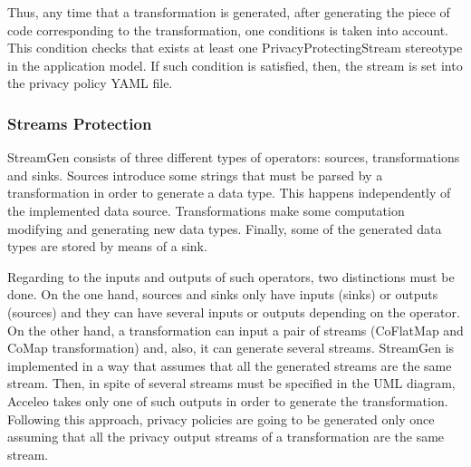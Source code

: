 

Thus, any time that a transformation is generated, after generating the piece of code corresponding to the transformation, one conditions is taken into account. This condition checks that exists at least one PrivacyProtectingStream stereotype in the application model. If such condition is satisfied, then, the stream is set into the privacy policy YAML file.

\subsubsection{Streams Protection}

StreamGen consists of three different types of operators: sources, transformations and sinks. Sources introduce some strings that must be parsed by a transformation in order to generate a data type. This happens independently of the implemented data source. Transformations make some computation modifying and generating new data types. Finally, some of the generated data types are stored by means of a sink.

Regarding to the inputs and outputs of such operators, two distinctions must be done. On the one hand, sources and sinks only have inputs (sinks) or outputs (sources) and they can have several inputs or outputs depending on the operator. On the other hand, a transformation can input a pair of streams (CoFlatMap and CoMap transformation) and, also, it can generate several streams. StreamGen is implemented in a way that assumes that all the generated streams are the same stream. Then, in spite of several streams must be specified in the UML diagram, Acceleo takes only one of such outputs in order to generate the transformation. Following this approach, privacy policies are going to be generated only once assuming that all the privacy output streams of a transformation are the same stream.

